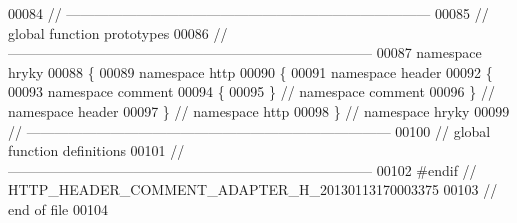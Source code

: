 \begin{DoxyCode}
00084 \textcolor{comment}{//
      ------------------------------------------------------------------------------}
00085 \textcolor{comment}{// global function prototypes}
00086 \textcolor{comment}{//
      ------------------------------------------------------------------------------}
00087 \textcolor{keyword}{namespace }hryky
00088 \{
00089 \textcolor{keyword}{namespace }http
00090 \{
00091 \textcolor{keyword}{namespace }header
00092 \{
00093 \textcolor{keyword}{namespace }comment
00094 \{
00095 \} \textcolor{comment}{// namespace comment}
00096 \} \textcolor{comment}{// namespace header}
00097 \} \textcolor{comment}{// namespace http}
00098 \} \textcolor{comment}{// namespace hryky}
00099 \textcolor{comment}{//
      ------------------------------------------------------------------------------}
00100 \textcolor{comment}{// global function definitions}
00101 \textcolor{comment}{//
      ------------------------------------------------------------------------------}
00102 \textcolor{preprocessor}{#endif // HTTP\_HEADER\_COMMENT\_ADAPTER\_H\_20130113170003375}
00103 \textcolor{preprocessor}{}\textcolor{comment}{// end of file}
00104 
\end{DoxyCode}
